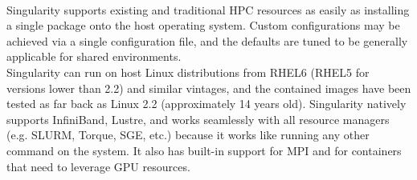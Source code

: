 \documentclass[a4paper]{article}
\begin{document}
\\[0.2in]
Singularity supports existing and traditional HPC resources as easily as installing a single package onto the host operating system. Custom configurations may be achieved via a single configuration file, and the defaults are tuned to be generally applicable for shared environments.
\\[0.2in]
Singularity can run on host Linux distributions from RHEL6 (RHEL5 for versions lower than 2.2) and similar vintages, and the contained images have been tested as far back as Linux 2.2 (approximately 14 years old). Singularity natively supports InfiniBand, Lustre, and works seamlessly with all resource managers (e.g. SLURM, Torque, SGE, etc.) because it works like running any other command on the system. It also has built-in support for MPI and for containers that need to leverage GPU resources.
\end{document}
